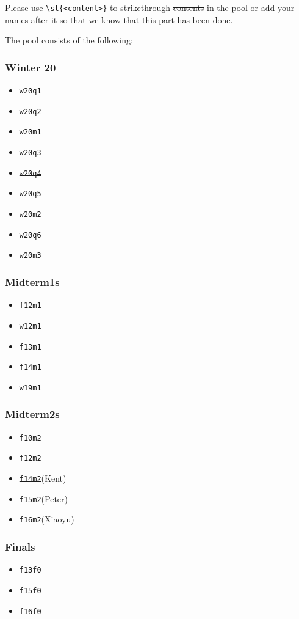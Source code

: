 Please use \lstinline|\st{<content>}| to strikethrough \st{contents} in the pool or add your names after it so that we know that this part has been done.

The pool consists of the following:

\begin{minipage}[t]{0.24\textwidth}
    \subsubsection*{Winter 20}
    \begin{itemize}
        \item \texttt{w20q1}
        \item \texttt{w20q2}
        \item \texttt{w20m1}
        \item \st{\texttt{w20q3}}
        \item \st{\texttt{w20q4}}
        \item \st{\texttt{w20q5}}
        \item \texttt{w20m2}
        \item \texttt{w20q6}
        \item \texttt{w20m3}
    \end{itemize}
\end{minipage}
\begin{minipage}[t]{0.24\textwidth}
    \subsubsection*{Midterm1s}
    \begin{itemize}
        \item \texttt{f12m1}
        \item \texttt{w12m1}
        \item \texttt{f13m1}
        \item \texttt{f14m1}
        \item \texttt{w19m1}
    \end{itemize}    
\end{minipage}
\begin{minipage}[t]{0.24\textwidth}
    \subsubsection*{Midterm2s}
    \begin{itemize}
        \item \texttt{f10m2}
        \item \texttt{f12m2}
        \item \st{\texttt{f14m2}(Kent)}
        \item \st{\texttt{f15m2}(Peter)}
        \item \texttt{f16m2}(Xiaoyu)
    \end{itemize}    
\end{minipage}
\begin{minipage}[t]{0.24\textwidth}
    \subsubsection*{Finals}
    \begin{itemize}
        \item \texttt{f13f0}
        \item \texttt{f15f0}
        \item \texttt{f16f0}
    \end{itemize}
\end{minipage}